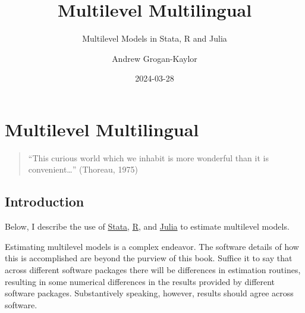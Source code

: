 \documentclass[
  letterpaper,
  DIV=11,
  numbers=noendperiod]{scrreprt}
\title{Multilevel Multilingual}
\subtitle{Multilevel Models in Stata, R and Julia}
\author{Andrew Grogan-Kaylor}
\date{2024-03-28}
\renewcommand*\contentsname{Table of contents}
\newcommand\contentsname{Table of contents}
\begin{document}
\maketitle

\renewcommand*\contentsname{Table of contents}
{
\hypersetup{linkcolor=}
\setcounter{tocdepth}{2}
\tableofcontents
}
\listoffigures
\listoftables
{}

\chapter{Multilevel Multilingual}\label{multilevel-multilingual}

\begin{quote}
``This curious world which we inhabit is more wonderful than it is
convenient\ldots{}'' (Thoreau, 1975)
\end{quote}

\section{Introduction}\label{introduction}

Below, I describe the use of \href{https://www.stata.com/}{Stata},
\href{https://www.r-project.org/}{R}, and
\href{https://www.julialang.org/}{Julia} to estimate multilevel models.

\begin{tcolorbox}[enhanced jigsaw, opacityback=0, arc=.35mm, coltitle=black, colframe=quarto-callout-tip-color-frame, toptitle=1mm, colbacktitle=quarto-callout-tip-color!10!white, toprule=.15mm, colback=white, left=2mm, bottomtitle=1mm, bottomrule=.15mm, title=\textcolor{quarto-callout-tip-color}{\faLightbulb}\hspace{0.5em}{Results Will Vary Somewhat}, rightrule=.15mm, opacitybacktitle=0.6, titlerule=0mm, leftrule=.75mm, breakable]

Estimating multilevel models is a complex endeavor. The software details
of how this is accomplished are beyond the purview of this book. Suffice
it to say that across different software packages there will be
differences in estimation routines, resulting in some numerical
differences in the results provided by different software packages.
Substantively speaking, however, results should agree across software.

\end{tcolorbox}
\end{document}
